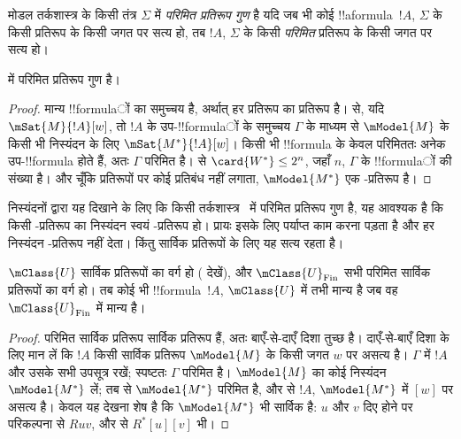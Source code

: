 \documentclass[../../../include/open-logic-section]{subfiles}
\begin{document}


\begin{defn}
  मोडल तर्कशास्त्र के किसी तंत्र $\Sigma$ में \emph{परिमित प्रतिरूप गुण}
  है यदि जब भी कोई !!a{formula}~$!A$, $\Sigma$ के किसी प्रतिरूप के किसी
  जगत पर सत्य हो, तब $!A$, $\Sigma$ के किसी \emph{परिमित} प्रतिरूप के
  किसी जगत पर सत्य हो।
\end{defn}

\begin{prop}
   में परिमित प्रतिरूप गुण है।
\end{prop}

\begin{proof}
   मान्य !!{formula}ों का समुच्चय है, अर्थात् हर प्रतिरूप 
  का प्रतिरूप है।  से, यदि
  $\mSat{M}{!A}[w]$, तो $!A$ के उप-!!{formula}ों के समुच्चय $\Gamma$ के
  माध्यम से $\mModel{M}$ के किसी भी निस्यंदन के लिए
  $\mSat{M^*}{!A}[w]$। किसी भी !!{formula} के केवल परिमिततः अनेक
  उप-!!{formula} होते हैं, अतः $\Gamma$ परिमित है।
   से $\card{W^*} \le 2^n$, जहाँ $n$,
  $\Gamma$ के !!{formula}ों की संख्या है। और चूँकि  प्रतिरूपों पर
  कोई प्रतिबंध नहीं लगाता, $\mModel{M^*}$ एक -प्रतिरूप है।
\end{proof}

निस्यंदनों द्वारा यह दिखाने के लिए कि किसी तर्कशास्त्र~ में परिमित
प्रतिरूप गुण है, यह आवश्यक है कि किसी -प्रतिरूप का निस्यंदन स्वयं
-प्रतिरूप हो। प्रायः इसके लिए पर्याप्त काम करना पड़ता है और हर
निस्यंदन -प्रतिरूप नहीं देता। किंतु सार्विक प्रतिरूपों के लिए यह
सत्य रहता है।

\begin{prop}
  $\mClass{U}$ सार्विक प्रतिरूपों का वर्ग हो
  ( देखें), और
  $\mClass{U}_\mathrm{Fin}$ सभी परिमित सार्विक प्रतिरूपों का वर्ग हो। तब
  कोई भी !!{formula}~$!A$, $\mClass{U}$ में तभी मान्य है जब वह
  $\mClass{U}_\mathrm{Fin}$ में मान्य है।
\end{prop}

\begin{proof}
  परिमित सार्विक प्रतिरूप सार्विक प्रतिरूप हैं, अतः बाएँ-से-दाएँ दिशा
  तुच्छ है। दाएँ-से-बाएँ दिशा के लिए मान लें कि $!A$ किसी सार्विक
  प्रतिरूप $\mModel{M}$ के किसी जगत $w$ पर असत्य है। $\Gamma$ में $!A$
  और उसके सभी उपसूत्र रखें; स्पष्टतः $\Gamma$ परिमित है। $\mModel{M}$ का
  कोई निस्यंदन $\mModel{M^*}$ लें; तब
   से $\mModel{M^*}$ परिमित है, और
   से $!A$, $\mModel{M^*}$ में $[w]$ पर
  असत्य है। केवल यह देखना शेष है कि $\mModel{M^*}$ भी सार्विक है: $u$ और
  $v$ दिए होने पर परिकल्पना से $Ruv$, और
   से
  $R^*[u][v]$ भी।
\end{proof}
\end{document}
